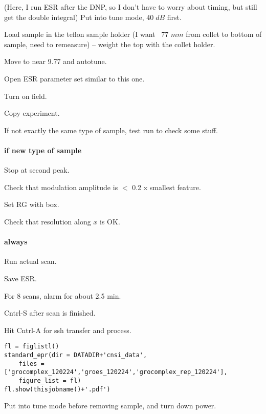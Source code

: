 (Here, I run ESR after the DNP, so I don't have to worry about timing, but still get the double integral)
Put into tune mode, $40\;dB$ first.

Load sample in the teflon sample holder (I want ~77 $mm$ from collet to bottom of sample, need to remeasure) -- weight the top with the collet holder.

Move to near 9.77 and autotune.

Open ESR parameter set similar to this one.

Turn on field.

Copy experiment.

If not exactly the same type of sample, test run to check some stuff.


\paragraph{if new type of sample}
Stop at second peak.

Check that modulation amplitude is $<$ 0.2 x smallest feature.

Set RG with box.

Check that resolution along $x$ is OK.

\paragraph{always}

Run actual scan.

Save ESR.

For 8 scans, alarm for about 2.5 min.

Cntrl-S after scan is finished.

Hit Cntrl-A for ssh transfer and process.


\begin{tiny}
\begin{lstlisting}
fl = figlistl()
standard_epr(dir = DATADIR+'cnsi_data',
    files = ['grocomplex_120224','groes_120224','grocomplex_rep_120224'],
    figure_list = fl)
fl.show(thisjobname()+'.pdf')
\end{lstlisting}
\end{tiny}

Put into tune mode before removing sample, and turn down power.

